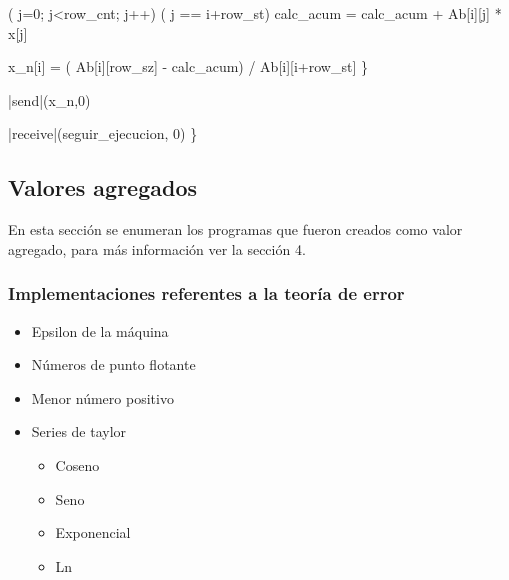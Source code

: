 \documentclass{article}
\begin{document}
\begin{program}
    \FOR ( j=0; j<row\_cnt; j++)  
    \IF ( j == i+row\_st) 
    \ELSE calc\_acum = calc\_acum + Ab[i][j] * x[j]
\end{program}

\begin{program}
    x\_n[i] = ( Ab[i][row\_sz] - calc\_acum) / Ab[i][i+row\_st] 
    \}
\end{program}

\begin{program}
    |send|(x\_n,0) 
\end{program}

\begin{program}
    |receive|(seguir\_ejecucion, 0) 
    \}
\end{program}

\subsection{Valores agregados}

En esta sección se enumeran los programas que fueron creados como
valor agregado, para más información ver la sección 4.

\subsubsection{Implementaciones referentes a la teoría de error}

\begin{itemize}
    \item Epsilon de la máquina
    \item Números de punto flotante
    \item Menor número positivo
    \item Series de taylor

        \begin{itemize}
            \item Coseno
            \item Seno
            \item Exponencial
            \item Ln
        \end{itemize}
\end{itemize}
\end{document}
